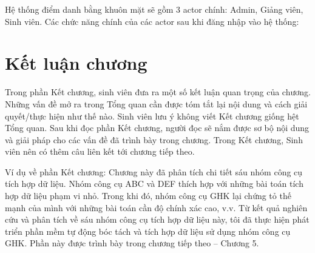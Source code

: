 Hệ thống điểm danh bằng khuôn mặt sẽ gồm 3 actor chính: Admin, Giảng viên, Sinh
viên. Các chức năng chính của các actor sau khi đăng nhập vào hệ thống:

\section*{Kết luận chương}
Trong phần Kết chương, sinh viên đưa ra một số kết luận quan trọng của chương. Những vấn đề mở ra trong Tổng quan cần được tóm tắt lại nội dung và cách giải quyết/thực hiện như thế nào. Sinh viên lưu ý không viết Kết chương giống hệt Tổng quan. Sau khi đọc phần Kết chương, người đọc sẽ nắm được sơ bộ nội dung và giải pháp cho các vấn đề đã trình bày trong chương. Trong Kết chương, Sinh viên nên có thêm câu liên kết tới chương tiếp theo.

Ví dụ về phần Kết chương: Chương này đã phân tích chi tiết sáu nhóm công cụ tích hợp dữ liệu. Nhóm công cụ ABC và DEF thích hợp với những bài toán tích hợp dữ liệu phạm vi nhỏ. Trong khi đó, nhóm công cụ GHK lại chứng tỏ thế mạnh của mình với những bài toán cần độ chính xác cao, v.v. Từ kết quả nghiên cứu và phân tích về sáu nhóm công cụ tích hợp dữ liệu này, tôi đã thực hiện phát triển phần mềm tự động bóc tách và tích hợp dữ liệu sử dụng nhóm công cụ GHK. Phần này được trình bày trong chương tiếp theo – Chương 5.





